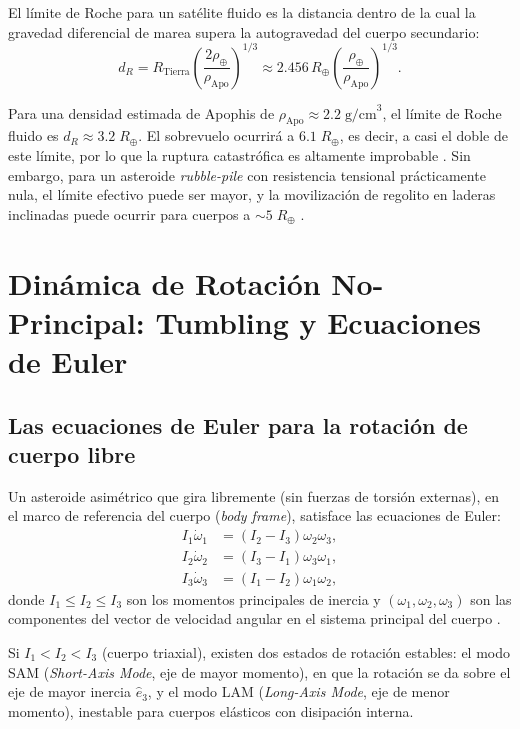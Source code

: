 \documentclass[a4paper]{article}
\begin{document}
El límite de Roche para un satélite fluido es la distancia dentro de la cual la gravedad diferencial de marea supera la autogravedad del cuerpo secundario:
\begin{equation}
  d_R = R_\text{Tierra}\left(\frac{2\rho_\oplus}{\rho_\text{Apo}}\right)^{1/3} \approx 2.456\, R_\oplus \left(\frac{\rho_\oplus}{\rho_\text{Apo}}\right)^{1/3}.
\end{equation}

Para una densidad estimada de Apophis de $\rho_\text{Apo} \approx 2.2\;\text{g/cm}^3$, el límite de Roche fluido es $d_R \approx 3.2\;R_\oplus$. El sobrevuelo ocurrirá a $6.1\;R_\oplus$, es decir, a casi el doble de este límite, por lo que la ruptura catastrófica es altamente improbable \cite{kim2023tidal}. Sin embargo, para un asteroide \textit{rubble-pile} con resistencia tensional prácticamente nula, el límite efectivo puede ser mayor, y la movilización de regolito en laderas inclinadas puede ocurrir para cuerpos a $\sim 5\;R_\oplus$ \cite{kim2023tidal, hirabayashi2024prediction}.

\section{Dinámica de Rotación No-Principal: Tumbling y Ecuaciones de Euler}

\subsection{Las ecuaciones de Euler para la rotación de cuerpo libre}

Un asteroide asimétrico que gira libremente (sin fuerzas de torsión externas), en el marco de referencia del cuerpo (\textit{body frame}), satisface las ecuaciones de Euler:
\begin{align}
  I_1\dot\omega_1 &= (I_2 - I_3)\omega_2\omega_3, \\
  I_2\dot\omega_2 &= (I_3 - I_1)\omega_3\omega_1, \\
  I_3\dot\omega_3 &= (I_1 - I_2)\omega_1\omega_2,
\end{align}
donde $I_1 \leq I_2 \leq I_3$ son los momentos principales de inercia y $(\omega_1, \omega_2, \omega_3)$ son las componentes del vector de velocidad angular en el sistema principal del cuerpo \cite{murray1999solar}.

Si $I_1 < I_2 < I_3$ (cuerpo triaxial), existen dos estados de rotación estables: el modo SAM (\textit{Short-Axis Mode}, eje de mayor momento), en que la rotación se da sobre el eje de mayor inercia $\hat{e}_3$, y el modo LAM (\textit{Long-Axis Mode}, eje de menor momento), inestable para cuerpos elásticos con disipación interna.
\end{document}
